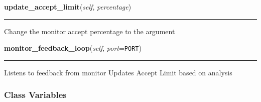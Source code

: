     \vspace{0.5ex}

\hspace{.8\funcindent}\begin{boxedminipage}{\funcwidth}

    \raggedright \textbf{update\_accept\_limit}(\textit{self}, \textit{percentage})

    \vspace{-1.5ex}

    \rule{\textwidth}{0.5\fboxrule}
\setlength{\parskip}{2ex}
    Change the monitor accept percentage to the argument

\setlength{\parskip}{1ex}
    \end{boxedminipage}

    \label{sdn_flowsampling:FlowSampRyu:controller:flow_samp:FlowSamp:monitor_feedback_loop}

    \vspace{0.5ex}

\hspace{.8\funcindent}\begin{boxedminipage}{\funcwidth}

    \raggedright \textbf{monitor\_feedback\_loop}(\textit{self}, \textit{port}={\tt PORT})

    \vspace{-1.5ex}

    \rule{\textwidth}{0.5\fboxrule}
\setlength{\parskip}{2ex}
    Listens to feedback from monitor Updates Accept Limit based on analysis

\setlength{\parskip}{1ex}
    \end{boxedminipage}



  \subsubsection{Class Variables}

